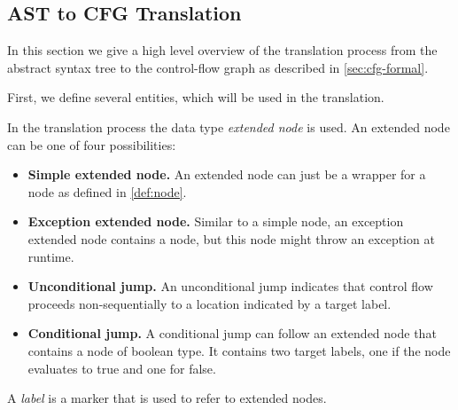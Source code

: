 \subsection{AST to CFG Translation}
\label{sec:ast_to_cfg_translation}

In this section we give a high level overview of the translation process from the
abstract syntax tree to the control-flow graph as described in \autoref{sec:cfg-formal}.

First, we define several entities, which will be used in the translation.

\begin{definition}
    In the translation process the data type \emph{extended node} is used.
    An extended node can be one of four possibilities:
    \begin{itemize}
        \item \textbf{Simple extended node.} An extended node can just be a wrapper for a node
        as defined in \autoref{def:node}.
        \item \textbf{Exception extended node.} Similar to a simple node, an exception extended
        node contains a node, but this node might throw an exception at runtime.
        \item \textbf{Unconditional jump.} An unconditional jump indicates that control
        flow proceeds non-sequentially to a location indicated by a target label.
        \item \textbf{Conditional jump.} A conditional jump can follow an extended node
        that contains a node of boolean type. It contains two target labels, one if the
        node evaluates to true and one for false.
    \end{itemize}
\end{definition}
\begin{definition}[Label]
    A \emph{label} is a marker that is used to refer to extended nodes.
\end{definition}

